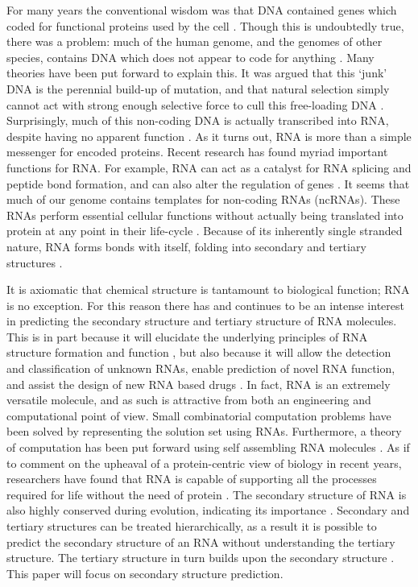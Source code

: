 \documentclass{cshonours}
\begin{document}
For many years the conventional wisdom was that DNA contained genes which coded for functional proteins used by the cell \cite{albertsessential}. Though this is undoubtedly true, there was a problem: much of the human genome, and the genomes of other species, contains DNA which does not appear to code for anything \cite{beaton1999eukaryotic}. Many theories have been put forward to explain this. It was argued that this `junk' DNA is the perennial build-up of mutation, and that natural selection simply cannot act with strong enough selective force to cull this free-loading DNA \cite{beaton1999eukaryotic}. Surprisingly, much of this non-coding DNA is actually transcribed into RNA, despite having no apparent function \cite{leung2013coral}. As it turns out, RNA is more than a simple messenger for encoded proteins. Recent research has found myriad important functions for RNA. For example, RNA can act as a catalyst for RNA splicing and peptide bond formation, and can also alter the regulation of genes \cite{xu2012statistical}. It seems that much of our genome contains templates for non-coding RNAs (ncRNAs). These RNAs perform essential cellular functions without actually being translated into protein at any point in their life-cycle \cite{leung2013coral}. Because of its inherently single stranded nature, RNA forms bonds with itself, folding into secondary and tertiary structures \cite{conn1998rna}.


It is axiomatic that chemical structure is tantamount to biological function; RNA is no exception. For this reason there has and continues to be an intense interest in predicting the secondary structure and tertiary structure of RNA molecules. This is in part because it will elucidate the underlying principles of RNA structure formation and function \cite{conn1998rna}, but also because it will allow the detection and classification of unknown RNAs, enable prediction of novel RNA function, and assist the design of new RNA based drugs \cite{condon2003problems}. In fact, RNA is an extremely versatile molecule, and as such is attractive from both an engineering and computational point of view. Small combinatorial computation problems have been solved by representing the solution set using RNAs. Furthermore, a theory of computation has been put forward using self assembling RNA molecules \cite{condon2003problems}. As if to comment on the upheaval of a protein-centric view of biology in recent years, researchers have found that RNA is capable of supporting all the processes required for life without the need of protein \cite{condon2003problems}. The secondary structure of RNA is also highly conserved during evolution, indicating its importance \cite{hofacker2008rna}. Secondary and tertiary structures can be treated hierarchically, as a result it is possible to predict the secondary structure of an RNA without understanding the tertiary structure. The tertiary structure in turn builds upon the secondary structure \cite{tinoco1999rna}. This paper will focus on secondary structure prediction.
\end{document}
